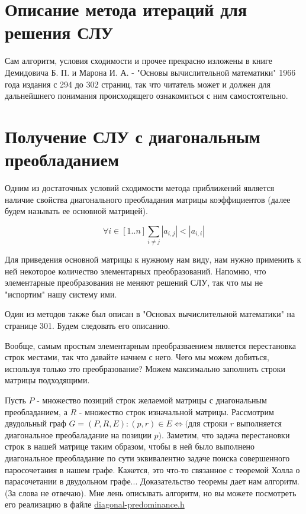 \documentclass{article}
\begin{document}
\section{Описание метода итераций для решения СЛУ}
Сам алгоритм, условия сходимости и прочее прекрасно изложены
в книге Демидовича Б. П. и Марона И. А.
- "Основы вычислительной математики" 1966 года издания с
294 до 302 страниц, так что читатель может и должен для
дальнейшнего понимания происходящего ознакомиться с ним
самостоятельно.

\section{Получение СЛУ с диагональным преобладанием}
Одним из достаточных условий сходимости метода приближений является
наличие свойства диагонального преобладания матрицы коэффициентов
(далее будем называть ее основной матрицей).

\begin{equation}
    \forall i \in [1..n] \sum_{i \neq j} |a_{i, j}| < |a_{i,i}|
\end{equation}

Для приведения основной матрицы к нужному нам виду, нам
нужно применить к ней некоторое количество элементарных
преобразований. Напомню, что элементарные преобразования не
меняют решений СЛУ, так что мы не "испортим" нашу систему ими.

Один из методов также был описан в
"Основах вычислительной математики" на странице 301.
Будем следовать его описанию.

Вообще, самым простым элементарным преобразваением является
перестановка строк местами, так что давайте начнем с него.
Чего мы можем добиться, используя только это преобразование?
Можем максимально заполнить строки матрицы подходящими.

Пусть $P$ - множество позиций строк желаемой матрицы с
диагональным преобладанием, а $R$ - множество
строк изначальной матрицы.
Рассмотрим двудольный граф $G = (P, R, E): (p, r) \in E
    \Leftrightarrow ($для строки $r$ выполняется диагональное
    преобаладание на позиции $p)$. Заметим, что задача перестановки
строк в нашей матрице таким образом, чтобы в ней было выполнено
диагональное преобладание по сути эквивалентно задаче
поиска совершенного паросочетания в нашем графе.
Кажется, это что-то связанное с теоремой Холла о парасочетании
в двудольном графе... Доказательство теоремы дает нам алгоритм.
(За слова не отвечаю). Мне лень описывать алгоритм, но вы можете
посмотреть его реализацию в файле \href{https://github.com/vityaman-edu/comp-math-systems-of-linear-equations/blob/trunk/app/sle/include/method/iteration/diagonal-predominance.h}{diagonal-predominance.h}
\end{document}
